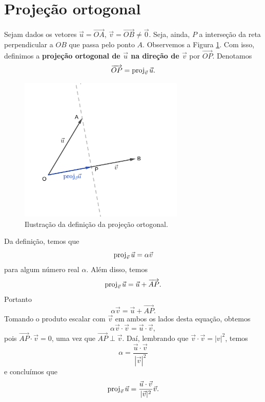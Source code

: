 \emconstrucao

\section{Projeção ortogonal}

Sejam dados os vetores $\vec{u}=\overrightarrow{OA}$, $\vec{v}=\overrightarrow{OB}\neq\vec{0}$. Seja, ainda, $P$ a interseção da reta perpendicular a $OB$ que passa pelo ponto $A$. Observemos a Figura \ref{fig:proj}. Com isso, definimos a {\bf projeção ortogonal de $\vec{u}$ na direção de $\vec{v}$}  por $\overrightarrow{OP}$. Denotamos
\begin{equation}
  \overrightarrow{OP} = \operatorname{proj}_{\vec{v}}\vec{u}.
\end{equation}

\begin{figure}[H]
  \centering
  \includegraphics[width=0.7\textwidth]{./cap_prodesc/dados/fig_proj/fig_proj}
  \caption{Ilustração da definição da projeção ortogonal.}
  \label{fig:proj}
\end{figure}

Da definição, temos que
\begin{equation}
  \operatorname{proj}_{\vec{v}}\vec{u} = \alpha\vec{v}
\end{equation}
para algum número real $\alpha$. Além disso, temos
\begin{equation}
  \operatorname{proj}_{\vec{v}}\vec{u} = \vec{u} + \overrightarrow{AP}.
\end{equation}
Portanto
\begin{equation}
  \alpha\vec{v} = \vec{u} + \overrightarrow{AP}.
\end{equation}
Tomando o produto escalar com $\vec{v}$ em ambos os lados desta equação, obtemos
\begin{equation}
  \alpha\vec{v}\cdot\vec{v} = \vec{u}\cdot\vec{v},
\end{equation}
pois $\overrightarrow{AP}\cdot\vec{v}=0$, uma vez que $\overrightarrow{AP}\perp\vec{v}$. Daí, lembrando que $\vec{v}\cdot\vec{v}=|v|^2$, temos
\begin{equation}
  \alpha = \frac{\vec{u}\cdot\vec{v}}{|\vec{v}|^2}
\end{equation}
e concluímos que
\begin{equation}\label{eq:proj}
  \operatorname{proj}_{\vec{v}}\vec{u} = \frac{\vec{u}\cdot\vec{v}}{|\vec{v}|^2}\vec{v}.
\end{equation}

